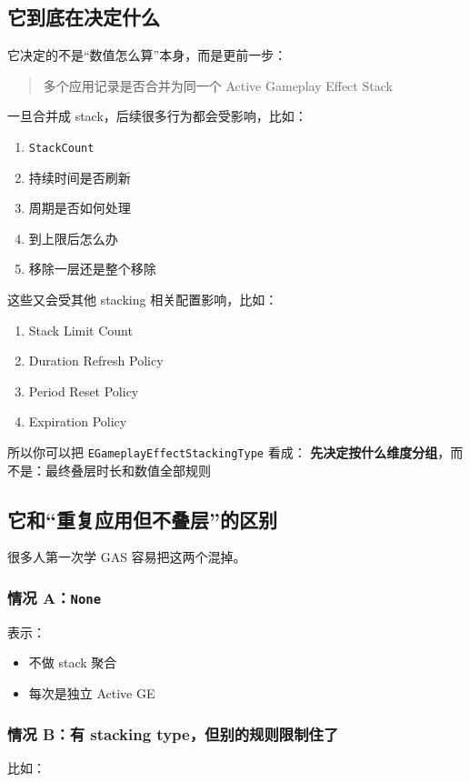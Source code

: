 \subsection{它到底在决定什么}

它决定的不是“数值怎么算”本身，而是更前一步：

\begin{quote}
	多个应用记录是否合并为同一个 Active Gameplay Effect Stack
\end{quote}

一旦合并成 stack，后续很多行为都会受影响，比如：
\begin{enumerate}
	\item \texttt{StackCount}
	\item 持续时间是否刷新
	\item 周期是否如何处理
	\item 到上限后怎么办
	\item 移除一层还是整个移除
\end{enumerate}

这些又会受其他 stacking 相关配置影响，比如：
\begin{enumerate}
	\item Stack Limit Count
	\item Duration Refresh Policy
	\item Period Reset Policy
	\item Expiration Policy
\end{enumerate}

所以你可以把 \texttt{EGameplayEffectStackingType} 看成：	\textbf{先决定按什么维度分组}，而不是：最终叠层时长和数值全部规则

\subsection{它和“重复应用但不叠层”的区别}

很多人第一次学 GAS 容易把这两个混掉。

\subsubsection*{情况 A：\texttt{None}}
表示：

\begin{itemize}
	\item 不做 stack 聚合
	\item 每次是独立 Active GE
\end{itemize}

\subsubsection*{情况 B：有 stacking type，但别的规则限制住了}
比如：

